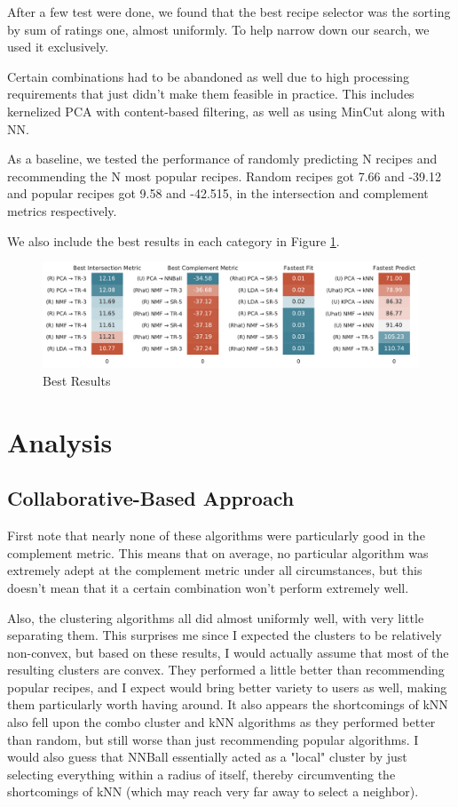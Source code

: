 \documentclass[11pt]{article}
\begin{document}
After a few test were done, we found that the best recipe selector was the sorting by sum of ratings one, almost uniformly. To help narrow down our search, we used it exclusively. 

Certain combinations had to be abandoned as well due to high processing requirements that just didn't make them feasible in practice. This includes kernelized PCA with content-based filtering, as well as using MinCut along with NN. 

As a baseline, we tested the performance of randomly predicting N recipes and recommending the N most popular recipes. Random recipes got 7.66 and -39.12 and popular recipes got 9.58 and -42.515, in the intersection and complement metrics respectively.


We also include the best results in each category in Figure \ref{fig:best}.
\begin{figure}[t]
\centering
\includegraphics[width=1\textwidth]{figs/best.pdf}
\caption{Best Results}
\label{fig:best}
\end{figure}


\section{Analysis}

\subsection{Collaborative-Based Approach}

First note that nearly none of these algorithms were particularly good in the complement metric. This means that on average, no particular algorithm was extremely adept at the complement metric under all circumstances, but this doesn't mean that it a certain combination won't perform extremely well.

Also, the clustering algorithms all did almost uniformly well, with very little separating them. This surprises me since I expected the clusters to be relatively non-convex, but based on these results, I would actually assume that most of the resulting clusters are convex. They performed a little better than recommending popular recipes, and I expect would bring better variety to users as well, making them particularly worth having around. It also appears the shortcomings of kNN also fell upon the combo cluster and kNN algorithms as they performed better than random, but still worse than just recommending popular algorithms. I would also guess that NNBall essentially acted as a "local" cluster by just selecting everything within a radius of itself, thereby circumventing the shortcomings of kNN (which may reach very far away to select a neighbor).
\end{document}
